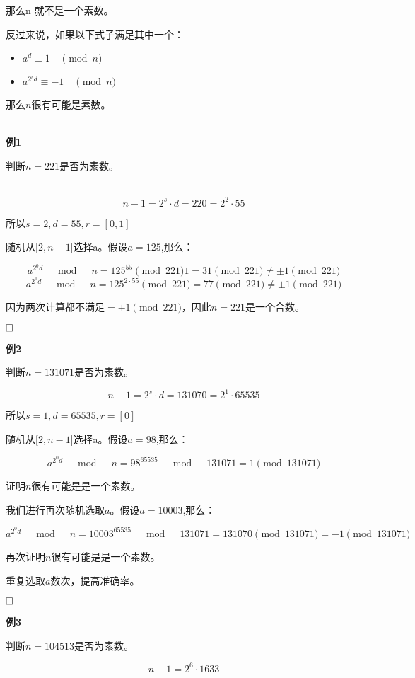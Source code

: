 \documentclass{article}
\begin{document}
那么n 就不是一个素数。

反过来说，如果以下式子满足其中一个：
\begin{itemize}
\item $a^{d} \equiv 1 \quad \pmod{n}$ 
\item $a^{2^{r} d} \equiv -1 \quad \pmod{n}$
\end{itemize}

那么$n$很有可能是素数。

~\\

\textbf{例1}

判断$n = 221$是否为素数。

~\\

$$n-1 = 2^s \cdot d = 220 = 2^2 \cdot 55$$

所以$s=2,d = 55,r = [0,1]$

随机从$[2 , n-1$]选择a。假设$a = 125$,那么：

$$a^{2^0d} \quad \bmod \quad n = 125^{55} \pmod{221}1 = 31 \pmod{221} \ne \pm 1 \pmod{221}$$
$$a^{2^1d} \quad \bmod \quad n = 125^{2 \cdot 55} \pmod{221} = 77  \pmod{221} \ne  \pm 1 \pmod{221}$$

因为两次计算都不满足$=\pm 1 \pmod{221}$，因此$n = 221$是一个合数。

$\hfill\square$ 

\textbf{例2}

判断$n = 131071$是否为素数。

$$n-1 = 2^s \cdot d =  131070 = 2^1 \cdot 65535$$

所以$s=1,d = 65535,r = [0]$

随机从$[2 , n-1$]选择a。假设$a = 98$,那么：

$$a^{2^0d} \quad \bmod \quad n = 98^{65535} \quad \bmod \quad 131071 = 1 \pmod{131071}$$

证明$n$很有可能是是一个素数。

我们进行再次随机选取$a$。假设$a = 10003$,那么：

$$a^{2^0d} \quad \bmod \quad n = 10003^{65535} \quad \bmod \quad 131071 = 131070 \pmod{131071} = -1  \pmod{131071}$$

再次证明$n$很有可能是是一个素数。

重复选取$a$数次，提高准确率。

$\hfill\square$

\textbf{例3}

判断$n = 104513$是否为素数。

$$ n-1=2^{6} \cdot 1633 $$
\end{document}
